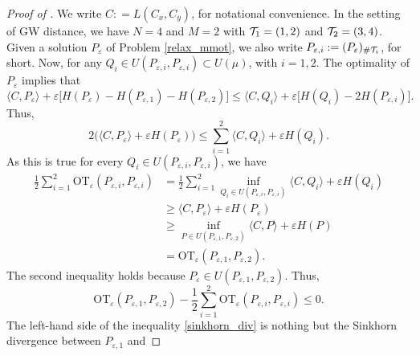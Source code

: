 \begin{proof}[Proof of ]
We write $C: = L(C_x,C_y)$, for notational convenience.
In the setting of GW distance, we have $N=4$ and $M = 2$ with $\mathcal T_1 = (1,2)$ and $\mathcal T_2 = (3,4)$.
Given a solution $P_{\varepsilon}$ of Problem \eqref{relax_mmot}, we also write
$P_{\varepsilon, i} := (P_{\varepsilon})_{\# \mathcal T_i}$, for short. Now,
for any $Q_i \in U( P_{\varepsilon, i}, P_{\varepsilon, i}) \subset U(\mu)$, with $i = 1,2$.
The optimality of $P_{\varepsilon}$ implies that
\begin{equation}
    \langle C, P_{\varepsilon} \rangle + \varepsilon \big[ H(P_{\varepsilon}) - H(P_{\varepsilon, 1}) -
    H(P_{\varepsilon, 2}) \big] \leq
    \langle C, Q_i \rangle + \varepsilon \big[ H(Q_i) - 2 H(P_{\varepsilon, i}) \big].
\end{equation}
Thus,
\begin{equation}
    2 \big( \langle C, P_{\varepsilon} \rangle + \varepsilon H(P_{\varepsilon}) \big) \leq
    \sum_{i=1}^2 \langle C, Q_i \rangle + \varepsilon H(Q_i).
\end{equation}
As this is true for every $Q_i \in U(P_{\varepsilon, i}, P_{\varepsilon, i})$, we have
\begin{equation}
    \begin{split}
        \frac{1}{2} \sum_{i=1}^2
        \text{OT}_{\varepsilon}(P_{\varepsilon, i}, P_{\varepsilon, i})
        &= \frac{1}{2} \sum_{i=1}^2 \inf_{Q_i \in U(P_{\varepsilon, i}, P_{\varepsilon, i})}
        \langle C, Q_i \rangle + \varepsilon H(Q_i) \\
        &\geq \langle C, P_{\varepsilon} \rangle + \varepsilon H(P_{\varepsilon}) \\
        &\geq \inf_{P \in U(P_{\varepsilon, 1}, P_{\varepsilon, 2})}
        \langle C, P \rangle + \varepsilon H(P) \\
        &= \text{OT}_{\varepsilon}(P_{\varepsilon, 1}, P_{\varepsilon, 2}).
    \end{split}
\end{equation}
The second inequality holds because $P_{\varepsilon} \in U(P_{\varepsilon, 1}, P_{\varepsilon, 2})$. Thus,
\begin{equation} \label{sinkhorn_div}
  \text{OT}_{\varepsilon}(P_{\varepsilon, 1}, P_{\varepsilon, 2}) -
  \frac{1}{2} \sum_{i=1}^2 \text{OT}_{\varepsilon}(P_{\varepsilon, i}, P_{\varepsilon, i}) \leq 0.
\end{equation}
The left-hand side of the inequality \eqref{sinkhorn_div} is nothing but the Sinkhorn divergence between $P_{\varepsilon, 1}$ and

\end{proof}
